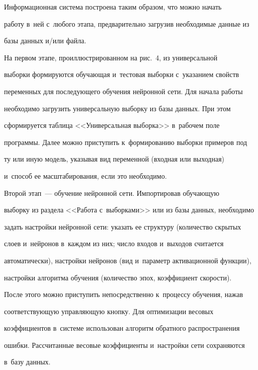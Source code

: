  Информационная система построена таким образом, что можно начать 


работу в~ней с~любого этапа, предварительно загрузив необходимые данные из 


базы данных и/или файла.


  


  На первом этапе, проиллюстрированном на рис.~4, из универсальной 


выборки формируются обучающая и~тестовая выборки с~указанием свойств 


переменных для последующего обучения нейронной сети. Для начала работы 


необходимо загрузить универсальную выборку из базы данных. При этом 


сформируется таб\-ли\-ца <<Универсальная выборка>> в~рабочем поле 


программы. Далее можно приступить к~формированию выборки примеров под 


ту или иную модель, указывая вид переменной (входная или выходная) 


и~способ ее масштабирования, если это необходимо.


  


  Второй этап~--- обучение нейронной сети. Импортировав обучающую 


выборку из раздела <<Работа с~выборками>> или из базы данных, необходимо 


задать настройки нейронной сети: указать ее структуру (количество скрытых 


слоев и~нейронов в~каждом из них; число входов и~выходов считается 


автоматически), настройки нейронов (вид и~параметр активационной функции), 


настройки алгоритма обучения (количество эпох, коэффициент скорости). 


После этого можно приступить непосредственно к~процессу обучения, нажав 


соответствующую управ\-ля\-ющую кнопку. Для оптимизации весовых 


коэффициентов в~системе использован алгоритм обратного распространения 


ошибки. Рассчитанные весовые коэффициенты и~настройки сети сохраняются 


в~базу данных.





